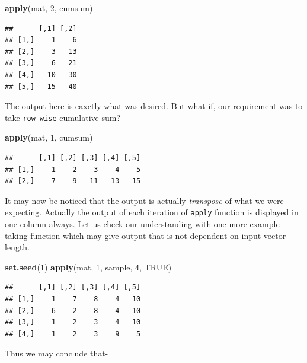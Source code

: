 \documentclass[
]{book}
\newenvironment{Shaded}{\begin{snugshade}}{\end{snugshade}}
\newcommand{\ConstantTok}[1]{\textcolor[rgb]{0.56,0.35,0.01}{#1}}
\newcommand{\DecValTok}[1]{\textcolor[rgb]{0.00,0.00,0.81}{#1}}
\newcommand{\FunctionTok}[1]{\textcolor[rgb]{0.13,0.29,0.53}{\textbf{#1}}}
\newcommand{\NormalTok}[1]{#1}
\begin{document}
\begin{Shaded}
\begin{Highlighting}[]
\FunctionTok{apply}\NormalTok{(mat, }\DecValTok{2}\NormalTok{, cumsum)}
\end{Highlighting}
\end{Shaded}

\begin{verbatim}
##      [,1] [,2]
## [1,]    1    6
## [2,]    3   13
## [3,]    6   21
## [4,]   10   30
## [5,]   15   40
\end{verbatim}

The output here is eaxctly what was desired. But what if, our requirement was to take \texttt{row-wise} cumulative sum?

\begin{Shaded}
\begin{Highlighting}[]
\FunctionTok{apply}\NormalTok{(mat, }\DecValTok{1}\NormalTok{, cumsum)}
\end{Highlighting}
\end{Shaded}

\begin{verbatim}
##      [,1] [,2] [,3] [,4] [,5]
## [1,]    1    2    3    4    5
## [2,]    7    9   11   13   15
\end{verbatim}

It may now be noticed that the output is actually \emph{transpose} of what we were expecting. Actually the output of each iteration of \texttt{apply} function is displayed in one column always. Let us check our understanding with one more example taking function which may give output that is not dependent on input vector length.

\begin{Shaded}
\begin{Highlighting}[]
\FunctionTok{set.seed}\NormalTok{(}\DecValTok{1}\NormalTok{)}
\FunctionTok{apply}\NormalTok{(mat, }\DecValTok{1}\NormalTok{, sample, }\DecValTok{4}\NormalTok{, }\ConstantTok{TRUE}\NormalTok{)}
\end{Highlighting}
\end{Shaded}

\begin{verbatim}
##      [,1] [,2] [,3] [,4] [,5]
## [1,]    1    7    8    4   10
## [2,]    6    2    8    4   10
## [3,]    1    2    3    4   10
## [4,]    1    2    3    9    5
\end{verbatim}

Thus we may conclude that-
\end{document}
